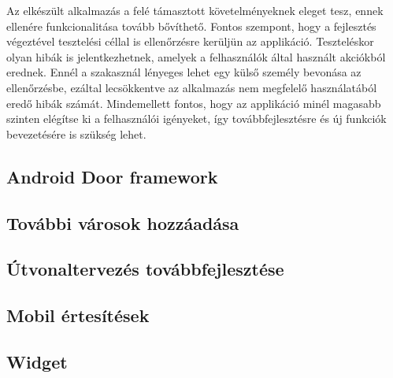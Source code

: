 
Az elkészült alkalmazás a felé támasztott követelményeknek eleget tesz, ennek ellenére funkcionalitása tovább bővíthető.
Fontos szempont, hogy a fejlesztés végeztével tesztelési céllal is ellenőrzésre kerüljün az applikáció.
Teszteléskor olyan hibák is jelentkezhetnek, amelyek a felhasználók által használt akciókból erednek.
Ennél a szakasznál lényeges lehet egy külső személy bevonása az ellenőrzésbe, ezáltal lecsökkentve az alkalmazás nem megfelelő használatából eredő hibák számát.
Mindemellett fontos, hogy az applikáció minél magasabb szinten elégítse ki a felhasználói igényeket, így továbbfejlesztésre és új funkciók bevezetésére is szükség lehet.

\subsection{Android Door framework}
\label{androiddoor}

\subsection{További városok hozzáadása}
\label{morecity}

\subsection{Útvonaltervezés továbbfejlesztése}
\label{routeplan}

\subsection{Mobil értesítések}
\label{pushnot}

\subsection{Widget}
\label{widget}











